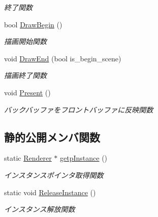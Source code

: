 \begin{DoxyCompactItemize}
\begin{DoxyCompactList}\small\item\em 終了関数 \end{DoxyCompactList}\item 
bool \mbox{\hyperlink{class_renderer_af420951c9c163f1151bd6600df204cee}{Draw\+Begin}} ()
\begin{DoxyCompactList}\small\item\em 描画開始関数 \end{DoxyCompactList}\item 
void \mbox{\hyperlink{class_renderer_a0393849bd4178a33861780bf07b0deee}{Draw\+End}} (bool is\+\_\+begin\+\_\+scene)
\begin{DoxyCompactList}\small\item\em 描画終了関数 \end{DoxyCompactList}\item 
void \mbox{\hyperlink{class_renderer_a1dac4baae1fa79166442b0778a9c8728}{Present}} ()
\begin{DoxyCompactList}\small\item\em バックバッファをフロントバッファに反映関数 \end{DoxyCompactList}\end{DoxyCompactItemize}
\subsection*{静的公開メンバ関数}
\begin{DoxyCompactItemize}
\item 
static \mbox{\hyperlink{class_renderer}{Renderer}} $\ast$ \mbox{\hyperlink{class_renderer_a995648604452c47b494de005b30de863}{getp\+Instance}} ()
\begin{DoxyCompactList}\small\item\em インスタンスポインタ取得関数 \end{DoxyCompactList}\item 
static void \mbox{\hyperlink{class_renderer_aa7ac523172faaf376ecddaed4bdc0781}{Release\+Instance}} ()
\begin{DoxyCompactList}\small\item\em インスタンス解放関数 \end{DoxyCompactList}\end{DoxyCompactItemize}
